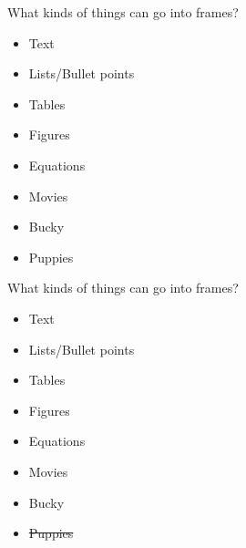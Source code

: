 \documentclass[mathserif, xcolor=svgnames]{beamer}
\begin{document}
\begin{frame}[label=list]{What kinds of things can go into frames?}
\begin{itemize}
\item\alert<1-> {Text}
\item\alert<2-> {Lists/Bullet points}
\item\alert<3-> {Tables}
\item\alert<4-> {Figures}
\item\alert<5 ->{Equations}
\item\alert<6->{Movies}
\item\alert<7-> {Bucky}
\item\alert<8-> {Puppies}
\end{itemize}
\vspace{1in}

\hyperlink{hyper}{}
\end{frame}


\begin{frame}{What kinds of things can go into frames?}

\begin{itemize}
\item Text
\item Lists/Bullet points
\item Tables
\item Figures
\item Equations
\item Movies
\item Bucky
\item \sout{Puppies}
\end{itemize}
\end{frame}
\end{document}
